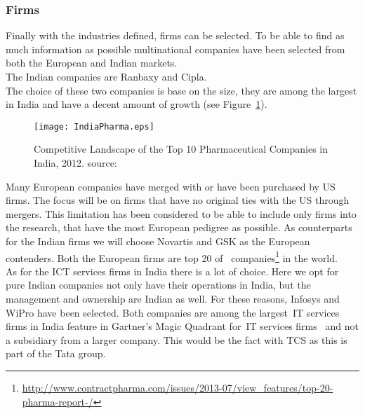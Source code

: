 
\subsubsection{Firms}

Finally with the industries defined, firms can be selected. 
To be able to find as much information as possible multinational \pharma companies have been selected from both the European and Indian markets.\\
The Indian \pharma companies are Ranbaxy and Cipla.\\ %
The choice of these two companies is base on the size, they are among the largest in India and have a decent amount of growth (see Figure~\ref{fig:IndiaPharma}).

\begin{figure}[htbp] 
	\centering
	\texttt{[image: IndiaPharma.eps]}
 	\caption[Competitive Landscape of the Top 10 Pharmaceutical Companies in India]{Competitive Landscape of the Top 10 Pharmaceutical Companies in India, 2012. source:~\citep{Research-and-Markets:2013}}\label{fig:IndiaPharma}
\end{figure}

Many European \pharma companies have merged with or have been purchased by US firms. 
The focus will be on firms that have no original ties with the US through mergers.
This limitation has been considered to be able to include only firms into the research, that have the most European pedigree as possible.
As counterparts for the Indian firms we will choose Novartis and GSK as the European contenders.
Both the European firms are top 20 of \pharma~companies\footnote{\url{http://www.contractpharma.com/issues/2013-07/view_features/top-20-pharma-report-/}} in the world.\\
As for the ICT services firms in India there is a lot of choice. 
Here we opt for pure Indian companies not only have their operations in India, but the management and ownership are Indian as well.
For these reasons, Infosys and WiPro have been selected. 
Both companies are among the largest~\gls{IT} services firms in India feature in Gartner's Magic Quadrant for~\gls{IT} services firms~\cite{Gartner:2013a} and not a subsidiary from a larger company.
This would be the fact with TCS as this is part of the Tata group.
 
